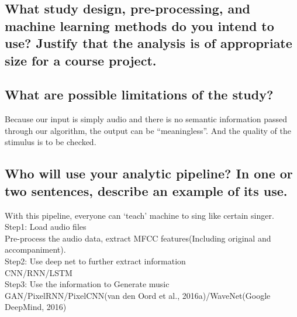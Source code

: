 \documentclass[twoside,11pt]{article}
\begin{document}
\subsection{What study design, pre-processing, and machine learning methods do you intend to use? Justify that the analysis is of appropriate size for a course project.}

\subsection{What are possible limitations of the study?}
Because our input is simply audio and there is no semantic information passed through our algorithm, the output can be “meaningless”. And the quality of the stimulus is to be checked.

\subsection{Who will use your analytic pipeline? In one or two sentences, describe an example of its use.}
With this pipeline, everyone can ‘teach’ machine to sing like certain singer.\\
Step1: Load audio files\\
Pre-process the audio data, extract MFCC features(Including original and accompaniment).\\
Step2: Use deep net to further extract information\\
CNN/RNN/LSTM\\
Step3: Use the information to Generate music\\
GAN/PixelRNN/PixelCNN(van den Oord et al., 2016a)/WaveNet(Google DeepMind, 2016)\\\



\end{document}
